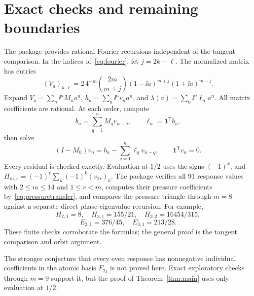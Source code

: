 \documentclass[11pt,a4paper]{article}
\theoremstyle{remark}\newtheorem*{ednote}{Editorial note (ProveIt, 2026-10-01)}
\begin{document}
\section{Exact checks and remaining boundaries}\label{sec:checks}
The package provides rational Fourier recursions independent of the tangent comparison. In the indices of~\eqref{eq:fourier}, let $j=2k-\ell$. The normalized matrix has entries
\[
 (V_a)_{k,\ell}=2\,4^{-m}\binom{2m}{m+j}
                   (1-\ii a)^{m+j}(1+\ii a)^{m-j}.
\]
Expand $V_a=\sum_n\ii^nM_na^n$, $h_a=\sum_n\ii^nv_na^n$, and $\lambda(a)=\sum_n\ii^n\ell_na^n$. All matrix coefficients are rational. At each order, compute
\[
 b_n=\sum_{q=1}^nM_qv_{n-q},\qquad \ell_n=\boldsymbol1^{\mathsf T}b_n,
\]
then solve
\[
 (I-M_0)v_n=b_n-\sum_{q=1}^n\ell_qv_{n-q},\qquad
 \boldsymbol1^{\mathsf T}v_n=0.
\]
Every residual is checked exactly. Evaluation at $1/2$ uses the signs $(-1)^k$, and $H_{m,r}=(-1)^r\sum_k(-1)^k(v_{2r})_k$. The package verifies all 91 response values with $2\le m\le14$ and $1\le r<m$, computes their pressure coefficients by~\eqref{eq:pressuretransfer}, and compares the pressure triangle through $m=8$ against a separate direct phase-eigenvalue recursion. For example,
\[
 H_{2,1}=8,\quad H_{3,1}=155/21,\quad H_{3,2}=16454/315,
\]
\[
 E_{2,1}=376/45,\quad E_{3,1}=213/28.
\]
These finite checks corroborate the formulas; the general proof is the tangent comparison and orbit argument.

The stronger conjecture that every even response has nonnegative individual coefficients in the atomic basis $F_{2j}$ is not proved here. Exact exploratory checks through $m=9$ support it, but the proof of Theorem~\ref{thm:main} uses only evaluation at $1/2$.
\end{document}
